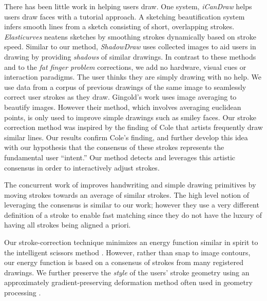 There has been little work in helping users draw. One system, \emph{iCanDraw} \cite{Dixon:2010:IUS} helps users draw faces with a tutorial approach. A sketching beautification system~\cite{Orbay2011} infers smooth lines from a sketch consisting of short, overlapping strokes. \emph{Elasticurves} \cite{Thiel:2011} neatens sketches by smoothing strokes dynamically based on stroke speed.  Similar to our method, \emph{ShadowDraw} \cite{Lee:2011} uses collected images to aid users in drawing by providing {\em shadows} of similar drawings.  In contrast to these methods and to the \emph{fat finger problem} corrections, we add no hardware, visual cues or interaction paradigms. The user thinks they are simply drawing with no help. We use data from a corpus of previous drawings of the same image to seamlessly correct user strokes as they draw. Gingold's work  uses image averaging to beautify images. However their method, which involves averaging euclidean points, is only used to improve simple drawings such as smiley faces. Our stroke correction method was inspired by the finding of Cole \etal {} that artists frequently draw similar lines. Our results confirm Cole's finding, and further develop this idea with our hypothesis that the consensus of these strokes represents the fundamental user ``intent.'' Our method detects and leverages this artistic consensus in order to
interactively adjust strokes.

The concurrent work of \cite{Zitnick:2013} improves handwriting and simple drawing primitives by moving strokes towards an average of similar strokes. The high level notion of leveraging the consensus is similar to our work; however they use a very different definition of a stroke to enable fast matching since they do not have the luxury of having all strokes being aligned a priori.

Our stroke-correction technique minimizes an energy function similar
in spirit to the intelligent scissors method
\cite{Mortensen:1995:ISF}. However, rather than snap to image
contours, our energy function is based on a consensus of strokes
from many registered drawings. We further preserve the {\em style}
of the users' stroke geometry using an approximately
gradient-preserving deformation method often used in geometry
processing \cite{Botsch:2008:LVS}.

